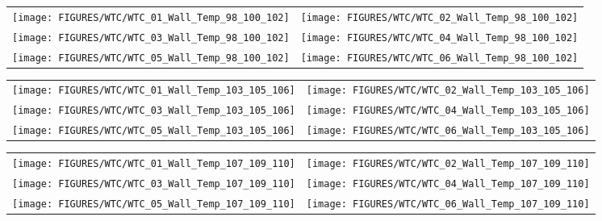 \begin{figure}[p]
\begin{tabular*}{\textwidth}{l@{\extracolsep{\fill}}r}
\texttt{[image: FIGURES/WTC/WTC\_01\_Wall\_Temp\_98\_100\_102]} &
\texttt{[image: FIGURES/WTC/WTC\_02\_Wall\_Temp\_98\_100\_102]} \\
\texttt{[image: FIGURES/WTC/WTC\_03\_Wall\_Temp\_98\_100\_102]} &
\texttt{[image: FIGURES/WTC/WTC\_04\_Wall\_Temp\_98\_100\_102]} \\
\texttt{[image: FIGURES/WTC/WTC\_05\_Wall\_Temp\_98\_100\_102]} &
\texttt{[image: FIGURES/WTC/WTC\_06\_Wall\_Temp\_98\_100\_102]}
\end{tabular*}
\label{NIST_WTC_Wall_98_100_102}
\end{figure}

\begin{figure}[p]
\begin{tabular*}{\textwidth}{l@{\extracolsep{\fill}}r}
\texttt{[image: FIGURES/WTC/WTC\_01\_Wall\_Temp\_103\_105\_106]} &
\texttt{[image: FIGURES/WTC/WTC\_02\_Wall\_Temp\_103\_105\_106]} \\
\texttt{[image: FIGURES/WTC/WTC\_03\_Wall\_Temp\_103\_105\_106]} &
\texttt{[image: FIGURES/WTC/WTC\_04\_Wall\_Temp\_103\_105\_106]} \\
\texttt{[image: FIGURES/WTC/WTC\_05\_Wall\_Temp\_103\_105\_106]} &
\texttt{[image: FIGURES/WTC/WTC\_06\_Wall\_Temp\_103\_105\_106]}
\end{tabular*}
\label{NIST_WTC_Wall_103_105_106}
\end{figure}

\begin{figure}[p]
\begin{tabular*}{\textwidth}{l@{\extracolsep{\fill}}r}
\texttt{[image: FIGURES/WTC/WTC\_01\_Wall\_Temp\_107\_109\_110]} &
\texttt{[image: FIGURES/WTC/WTC\_02\_Wall\_Temp\_107\_109\_110]} \\
\texttt{[image: FIGURES/WTC/WTC\_03\_Wall\_Temp\_107\_109\_110]} &
\texttt{[image: FIGURES/WTC/WTC\_04\_Wall\_Temp\_107\_109\_110]} \\
\texttt{[image: FIGURES/WTC/WTC\_05\_Wall\_Temp\_107\_109\_110]} &
\texttt{[image: FIGURES/WTC/WTC\_06\_Wall\_Temp\_107\_109\_110]}
\end{tabular*}
\label{NIST_WTC_Wall_107_109_110}
\end{figure}

